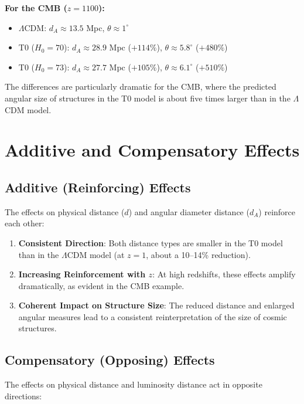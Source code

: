 \documentclass[a4paper,12pt]{article}
\theoremstyle{definition}
\theoremstyle{remark}
\begin{document}
	\textbf{For the CMB ($z = 1100$):}
	\begin{itemize}
		\item $\Lambda$CDM: $d_A \approx 13.5$ Mpc, $\theta \approx 1^\circ$
		\item T0 ($H_0 = 70$): $d_A \approx 28.9$ Mpc ($+114\%$), $\theta \approx 5.8^\circ$ ($+480\%$)
		\item T0 ($H_0 = 73$): $d_A \approx 27.7$ Mpc ($+105\%$), $\theta \approx 6.1^\circ$ ($+510\%$)
	\end{itemize}
	
	The differences are particularly dramatic for the CMB, where the predicted angular size of structures in the T0 model is about five times larger than in the $\Lambda$CDM model.
	
	\section{Additive and Compensatory Effects}
	
	\subsection{Additive (Reinforcing) Effects}
	
	The effects on physical distance ($d$) and angular diameter distance ($d_A$) reinforce each other:
	
	\begin{enumerate}
		\item \textbf{Consistent Direction}: Both distance types are smaller in the T0 model than in the $\Lambda$CDM model (at $z = 1$, about a 10–14\% reduction).
		
		\item \textbf{Increasing Reinforcement with $z$}: At high redshifts, these effects amplify dramatically, as evident in the CMB example.
		
		\item \textbf{Coherent Impact on Structure Size}: The reduced distance and enlarged angular measures lead to a consistent reinterpretation of the size of cosmic structures.
	\end{enumerate}
	
	\subsection{Compensatory (Opposing) Effects}
	
	The effects on physical distance and luminosity distance act in opposite directions:
	
\end{document}
